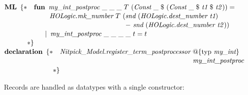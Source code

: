 \documentclass[a4paper,12pt]{article}
\renewcommand\_{\hbox{\textunderscore\kern-.05ex}}
\begin{document}
\prew
$\textbf{ML}~\,\{{*} \\
\!\begin{aligned}[t]
& \textbf{fun}\,~\textit{my\_int\_postproc}~\_~\_~\_~T~(\textit{Const}~\_~\$~(\textit{Const}~\_~\$~\textit{t1}~\$~\textit{t2\/})) = {} \\[-2pt]
& \phantom{fun}\,~\textit{HOLogic.mk\_number}~T~(\textit{snd}~(\textit{HOLogic.dest\_number~t1}) \\[-2pt]
& \phantom{fun\,~\textit{HOLogic.mk\_number}~T~(}{-}~\textit{snd}~(\textit{HOLogic.dest\_number~t2\/})) \\[-2pt]
& \phantom{fun}\!{\mid}\,~\textit{my\_int\_postproc}~\_~\_~\_~\_~t = t \\[-2pt]
{*}\}\end{aligned}$ \\[2\smallskipamount]
$\textbf{declaration}~\,\{{*} \\
\!\begin{aligned}[t]
& \textit{Nitpick\_Model.register\_term\_postprocessor}~\!\begin{aligned}[t]
  & @\{\textrm{typ}~\textit{my\_int}\} \\[-2pt]
  & \textit{my\_int\_postproc}\end{aligned} \\[-2pt]
{*}\}\end{aligned}$
\postw

Records are handled as datatypes with a single constructor:
\end{document}
